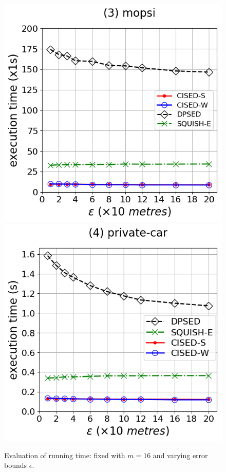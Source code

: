 \begin{figure}[tb!]
\includegraphics[scale = 0.30]{Figures/Exp-time-epsilon-mopsi.png}
\includegraphics[scale = 0.30]{Figures/Exp-time-epsilon-private.png}
\caption{\small Evaluation of running time: fixed with $m=16$ and varying error bounds $\epsilon$.}
\label{fig:time-epsilon}
\end{figure}



